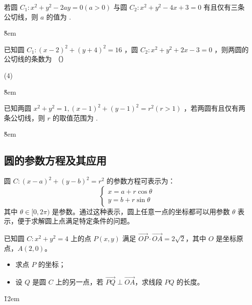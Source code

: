 \begin{example}
    若圆 $C_1: x^2+y^2-2 a y=0(a>0)$ 与圆 $C_2: x^2+y^2-4 x+3=0$ 有且仅有三条公切线，则 $a$ 的值为 \underline{\qquad}.
\end{example}

\v{8em}

\begin{example}
    已知圆 $C_1:(x-2)^2+(y+4)^2=16$ ，圆 $C_2: x^2+y^2+2 x-3=0$ ，则两圆的公切线的条数为 （\qquad）
    \begin{tasks}(4)
    \end{tasks}
\end{example}

\v{8em}

\begin{example}
    已知两圆 $x^2+y^2=1, (x-1)^2+(y-1)^2=r^2(r>1)$ ，若两圆有且仅有两条公切线，则 $r$ 的取值范围为 \underline{\qquad}.
\end{example}

\v{8em}

\subsection{圆的参数方程及其应用}

\begin{theorem}[圆的参数方程]
    圆 $C: (x-a)^2+(y-b)^2=r^2$ 的参数方程可表示为：
    $$
        \begin{cases}
            x = a + r\cos\theta \\
            y = b + r\sin\theta
        \end{cases}
    $$
    其中 $\theta \in [0, 2\pi)$ 是参数。通过这种表示，圆上任意一点的坐标都可以用参数 $\theta$ 表示，便于求解圆上点满足特定条件的问题。
\end{theorem}

\begin{example}
    已知圆 $C: x^2+y^2=4$ 上的点 $P(x,y)$ 满足 $\overrightarrow{OP} \cdot \overrightarrow{OA} = 2\sqrt{2}$，其中 $O$ 是坐标原点，$A(2,0)$。
    \begin{itemize}
        \item[(1)] 求点 $P$ 的坐标；
        \item[(2)] 设 $Q$ 是圆 $C$ 上的另一点，若 $\overrightarrow{PQ} \perp \overrightarrow{OA}$，求线段 $PQ$ 的长度。
    \end{itemize}
\end{example}

\v{12em}

